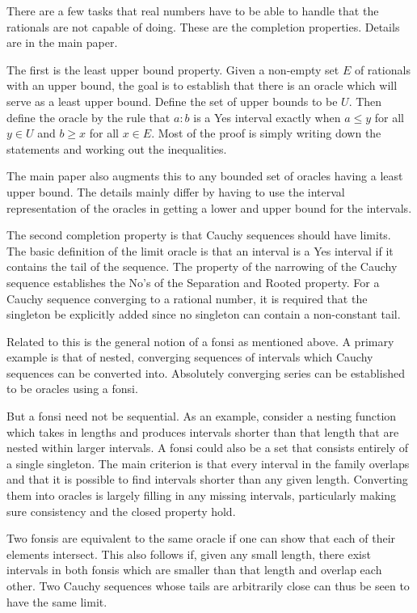 \documentclass[12pt]{article}
\theoremstyle{remark}
\begin{document}
There are a few tasks that real numbers have to be able to handle that the rationals are not capable of doing. These are the completion properties. Details are in the main paper.

The first is the least upper bound property. Given a non-empty set $E$ of rationals with an upper bound, the goal is  to establish that there is an oracle which will serve as a least upper bound. Define the set of upper bounds to be $U$. Then define the oracle by the rule that $a:b$ is a Yes interval exactly when $a\leq y$ for all $y \in U$ and $b\geq x$ for all $x\in E$. Most of the proof is simply writing down the statements and working out the inequalities. 

The main paper also augments this to any bounded set of oracles having a least upper bound. The details mainly differ by having to use the interval representation of the oracles in getting a lower and upper bound for the intervals. 

The second completion property is that Cauchy sequences should have limits. The basic definition of the limit oracle is that an interval is a Yes interval if it contains the tail of the sequence. The property of the narrowing of the Cauchy sequence establishes the No's of the Separation and Rooted property. For a Cauchy sequence converging to a rational number, it is required that the singleton be explicitly added since no singleton can contain a non-constant tail.

Related to this is the general notion of a fonsi as mentioned above. A primary example is that of nested, converging sequences of intervals which Cauchy sequences can be converted into. Absolutely converging series can be established to be oracles using a fonsi. 

But a fonsi need not be sequential. As an example, consider a nesting function which takes in lengths and produces intervals shorter than that length that are nested within larger intervals. A fonsi could also be a set that consists entirely of a single singleton. The main criterion is that every interval in the family overlaps and that it is possible to find intervals shorter than any given length. Converting them into oracles is largely filling in any missing intervals, particularly making sure consistency and the closed property hold.  

Two fonsis are equivalent to the same oracle if one can show that each of their elements intersect. This also follows if, given any small length, there exist intervals in both fonsis which are smaller than that length and overlap each other. Two Cauchy sequences whose tails are arbitrarily close can thus be seen to have the same limit. 
\end{document}
